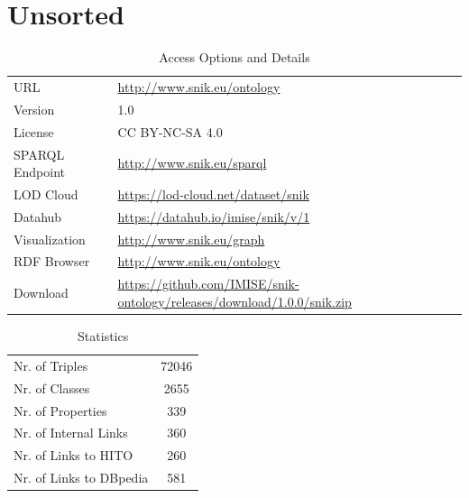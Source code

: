 \documentclass[sw]{iosart2x}
\newcommand{\snikversion}{1.0}
\newcommand{\sniktriples}{72046}
\newcommand{\snikclasses}{2655}
\newcommand{\snikproperties}{339}
\newcommand{\sniklinks}{581}
\begin{document}
\section{Unsorted}


\begin{table}
\caption{Access Options and Details}
\label{tab:access}
\begin{tabulary}{\columnwidth}{lL}
\toprule
URL		&\url{http://www.snik.eu/ontology}\\
Version		&\snikversion{}\\
License		&CC BY-NC-SA 4.0\\
SPARQL Endpoint	&\url{http://www.snik.eu/sparql}\\
LOD Cloud	&\url{https://lod-cloud.net/dataset/snik}\\
Datahub		&\url{https://datahub.io/imise/snik/v/1}\\
Visualization	&\url{http://www.snik.eu/graph}\\
RDF Browser	&\url{http://www.snik.eu/ontology}\\
Download	&\url{https://github.com/IMISE/snik-ontology/releases/download/1.0.0/snik.zip}\\
\bottomrule
\end{tabulary}%
\end{table}

\begin{table}
\caption{Statistics}
\label{tab:statistics}
\begin{tabulary}{\columnwidth}{lS}
\toprule
Nr. of Triples			&\sniktriples{}\\
Nr. of Classes			&\snikclasses{}\\
Nr. of Properties		&\snikproperties{}\\
Nr. of Internal Links		&360\\
Nr. of Links to HITO  		&260\\
Nr. of Links to DBpedia 	&\sniklinks{}\\
\bottomrule
\end{tabulary}%
\end{table}
\end{document}
